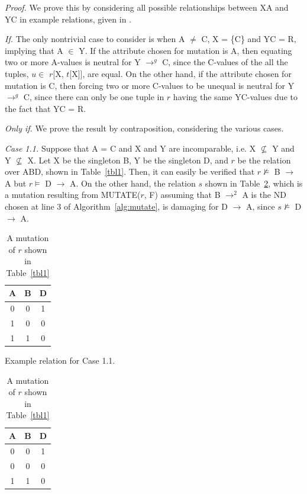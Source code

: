 {\em Proof.} We prove this by considering all possible relationships
between XA and YC in example relations, given in \cite{cl96}. \newline

{\em If.} 
The only nontrivial case to consider is when A $\not=$ C, X = \{C\} and YC = R,
implying that A $\in$ Y. If the attribute chosen for mutation is A,
then equating two or more A-values is neutral for Y $\to^g$ C, since the 
C-values of the all the tuples, $u \in$ $r$[X, $t$[X]], are equal. 
On the other hand, if the attribute chosen for mutation is C, 
then forcing two or more C-values to be unequal is neutral for Y $\to^g$ C, 
since there can only be one tuple in $r$ having the same YC-values
due to the fact that YC = R.

\medskip
{\em Only if.} 
We prove the result by contraposition, considering the various cases.

\smallskip

{\em Case 1.1.}
Suppose that A = C and X and Y are incomparable,
i.e.  X $\not\subseteq$ Y and Y $\not\subseteq$ X.
Let X be the singleton B, Y be the singleton D,
and $r$ be the relation over ABD, shown in Table~\ref{tbl1}.
Then, it can easily be verified that 
$r \not\models$ B $\to$ A but $r \models$ D $\to$ A.
On the other hand, the relation $s$ shown in Table~\ref{tbl2},
which is a mutation resulting from MUTATE($r$, F) assuming that 
B $\to^2$ A is the ND chosen at line 3 of Algorithm~\ref{alg:mutate},
is damaging for D $\to$ A, since $s \not\models$ D $\to$ A.

\begin{table}[ht]
\begin{minipage}[b]{7cm}
\begin{center}
\begin{tabular}{|c|c|c|} \hline
A & B & D \\ \hline
0 & 0 & 1 \\
1 & 0 & 0 \\
1 & 1 & 0 \\ \hline
\end{tabular}
\end{center}
\caption{\label{tbl1} Example relation for Case 1.1.} 
\end{minipage}
\hfill
\begin{minipage}[b]{7cm}
\begin{center}
\begin{tabular}{|c|c|c|} \hline
A & B & D \\ \hline
0 & 0 & 1 \\
0 & 0 & 0 \\
1 & 1 & 0 \\ \hline
\end{tabular}
\end{center}
\caption{\label{tbl2} A mutation of $r$ shown in Table~\ref{tbl1}} 
\end{minipage}
\end{table}


